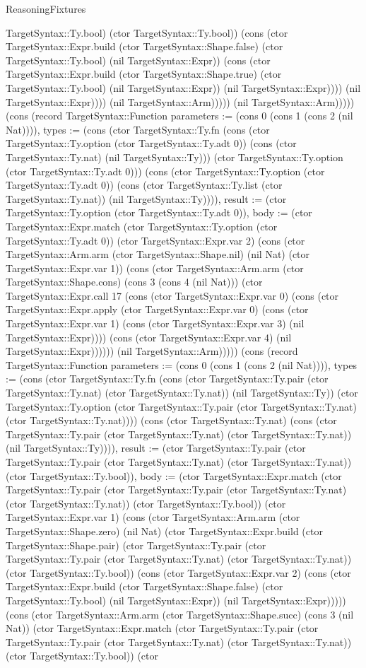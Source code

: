 \begin{lexlean}{ReasoningFixtures}
\begin{semanticmodule}
{TargetSyntax::Ty.bool) (ctor TargetSyntax::Ty.bool)) (cons (ctor TargetSyntax::Expr.build (ctor TargetSyntax::Shape.false) (ctor TargetSyntax::Ty.bool) (nil TargetSyntax::Expr)) (cons (ctor TargetSyntax::Expr.build (ctor TargetSyntax::Shape.true) (ctor TargetSyntax::Ty.bool) (nil TargetSyntax::Expr)) (nil TargetSyntax::Expr)))) (nil TargetSyntax::Expr)))) (nil TargetSyntax::Arm))))) (nil TargetSyntax::Arm))))}) (cons (record TargetSyntax::Function {parameters := (cons 0 (cons 1 (cons 2 (nil Nat)))), types := (cons (ctor TargetSyntax::Ty.fn (cons (ctor TargetSyntax::Ty.option (ctor TargetSyntax::Ty.adt 0)) (cons (ctor TargetSyntax::Ty.nat) (nil TargetSyntax::Ty))) (ctor TargetSyntax::Ty.option (ctor TargetSyntax::Ty.adt 0))) (cons (ctor TargetSyntax::Ty.option (ctor TargetSyntax::Ty.adt 0)) (cons (ctor TargetSyntax::Ty.list (ctor TargetSyntax::Ty.nat)) (nil TargetSyntax::Ty)))), result := (ctor TargetSyntax::Ty.option (ctor TargetSyntax::Ty.adt 0)), body := (ctor TargetSyntax::Expr.match (ctor TargetSyntax::Ty.option (ctor TargetSyntax::Ty.adt 0)) (ctor TargetSyntax::Expr.var 2) (cons (ctor TargetSyntax::Arm.arm (ctor TargetSyntax::Shape.nil) (nil Nat) (ctor TargetSyntax::Expr.var 1)) (cons (ctor TargetSyntax::Arm.arm (ctor TargetSyntax::Shape.cons) (cons 3 (cons 4 (nil Nat))) (ctor TargetSyntax::Expr.call 17 (cons (ctor TargetSyntax::Expr.var 0) (cons (ctor TargetSyntax::Expr.apply (ctor TargetSyntax::Expr.var 0) (cons (ctor TargetSyntax::Expr.var 1) (cons (ctor TargetSyntax::Expr.var 3) (nil TargetSyntax::Expr)))) (cons (ctor TargetSyntax::Expr.var 4) (nil TargetSyntax::Expr)))))) (nil TargetSyntax::Arm))))}) (cons (record TargetSyntax::Function {parameters := (cons 0 (cons 1 (cons 2 (nil Nat)))), types := (cons (ctor TargetSyntax::Ty.fn (cons (ctor TargetSyntax::Ty.pair (ctor TargetSyntax::Ty.nat) (ctor TargetSyntax::Ty.nat)) (nil TargetSyntax::Ty)) (ctor TargetSyntax::Ty.option (ctor TargetSyntax::Ty.pair (ctor TargetSyntax::Ty.nat) (ctor TargetSyntax::Ty.nat)))) (cons (ctor TargetSyntax::Ty.nat) (cons (ctor TargetSyntax::Ty.pair (ctor TargetSyntax::Ty.nat) (ctor TargetSyntax::Ty.nat)) (nil TargetSyntax::Ty)))), result := (ctor TargetSyntax::Ty.pair (ctor TargetSyntax::Ty.pair (ctor TargetSyntax::Ty.nat) (ctor TargetSyntax::Ty.nat)) (ctor TargetSyntax::Ty.bool)), body := (ctor TargetSyntax::Expr.match (ctor TargetSyntax::Ty.pair (ctor TargetSyntax::Ty.pair (ctor TargetSyntax::Ty.nat) (ctor TargetSyntax::Ty.nat)) (ctor TargetSyntax::Ty.bool)) (ctor TargetSyntax::Expr.var 1) (cons (ctor TargetSyntax::Arm.arm (ctor TargetSyntax::Shape.zero) (nil Nat) (ctor TargetSyntax::Expr.build (ctor TargetSyntax::Shape.pair) (ctor TargetSyntax::Ty.pair (ctor TargetSyntax::Ty.pair (ctor TargetSyntax::Ty.nat) (ctor TargetSyntax::Ty.nat)) (ctor TargetSyntax::Ty.bool)) (cons (ctor TargetSyntax::Expr.var 2) (cons (ctor TargetSyntax::Expr.build (ctor TargetSyntax::Shape.false) (ctor TargetSyntax::Ty.bool) (nil TargetSyntax::Expr)) (nil TargetSyntax::Expr))))) (cons (ctor TargetSyntax::Arm.arm (ctor TargetSyntax::Shape.succ) (cons 3 (nil Nat)) (ctor TargetSyntax::Expr.match (ctor TargetSyntax::Ty.pair (ctor TargetSyntax::Ty.pair (ctor TargetSyntax::Ty.nat) (ctor TargetSyntax::Ty.nat)) (ctor TargetSyntax::Ty.bool)) (ctor }
\end{semanticmodule}
\end{lexlean}
